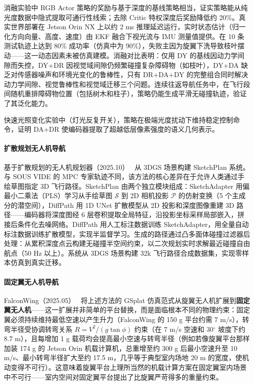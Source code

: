 消融实验中 RGB Actor 策略的奖励与基于深度的基线策略相当，证实策略能从纯光度数据中隐式提取可通行性线索；去除 Critic 特权深度后奖励降低约 20\%。真实世界部署在 Jetson Orin NX 上以约 2 ms 推理延迟运行，实时状态估计（归一化方向向量、高度、速度）由 EKF 融合下视光流与 IMU 测量值提供。在 10 条测试轨迹上达到 80\% 成功率（仿真中为 90\%），失败主因为旋翼下洗导致枝叶摆动——这一动态因素未被仿真建模。消融对比表明：仅用 DY 的基线因动力学间隙而失控，DY+DR 因视觉域间隙仍频繁碰撞复杂障碍物（如枝叶），DY+DA 缺乏对传感器噪声和环境光变化的鲁棒性，只有 DR+DA+DY 的完整组合同时解决动力学间隙、视觉鲁棒性和视觉域迁移三个问题。连续往返导航任务中，在飞行段间随机重排障碍物位置（包括树木和柱子），策略仍能生成平滑无碰撞轨迹，验证了其泛化能力。

快速光照变化实验中（灯光反复开关），策略在极端光度扰动下维持稳定控制命令，证明 DA+DR 使编码器提取了超越低层像素强度的语义几何表示。

\paragraph{扩散规划无人机导航}

基于扩散规划的无人机规划器（2025.10）~\cite{2510_03545} 从 3DGS 场景构建 SketchPlan 系统。与 SOUS VIDE 的 MPC 专家轨迹不同，该方法的核心差异在于允许人类通过手绘草图指定 3D 飞行路径。SketchPlan 由两个独立模块组成：SketchAdapter 用偏最小二乘法（PLS）学习从手绘草图 $\mathcal{S}$ 到 2D 相机投影 $\mathcal{P}$ 的仿射变换（5 个主成分的潜空间），DiffPath 用 1D UNet 扩散模型从 2D 投影和深度图像重建 3D 路径——编码器将深度图经 6 层卷积提取全局特征，沿投影坐标采样局部嵌入，拼接后条件化去噪网络。DiffPath 用人工标注数据训练 SketchAdapter，用全量自动标注数据训练扩散模型，实现半监督学习。生成的路径通过凸多面体碰撞过滤器后处理：从累积深度点云构建无碰撞半空间约束，以二次规划实时求解最近碰撞自由航点（50 Hz 以上）。系统从 3DGS 场景构建 32k 飞行路径合成数据集，实现零样本仿真到真实迁移。

\paragraph{固定翼无人机导航}

FalconWing（2025.05）~\cite{2505_01383} 将上述方法的 GSplat 仿真范式从旋翼无人机扩展到\textbf{固定翼无人机}——这一扩展并非简单的平台替换，而是面临根本不同的物理约束：固定翼必须持续维持最低空速以产生升力（FalconWing 的 150 g 平台约需 7 m/s），转弯半径受协调转弯关系 $R = V^2 / (g\tan\phi)$ 约束（在 7 m/s 空速和 30$^\circ$ 坡度下约 8.7 m），且每增加 1 g 载荷均会提高最小空速与转弯半径（例如若像旋翼平台那样加装 174 g 的 Jetson Orin 机载计算机，总重增至约 300 g 后最小空速升至 10 m/s、最小转弯半径扩大至约 17.5 m，几乎等于典型室内场地 20 m 的宽度，使机动变得不可行）。这意味着旋翼平台上理所当然的机载计算方案在固定翼室内场景中不可行——室内空间对固定翼平台提出了比旋翼严苛得多的重量约束。

